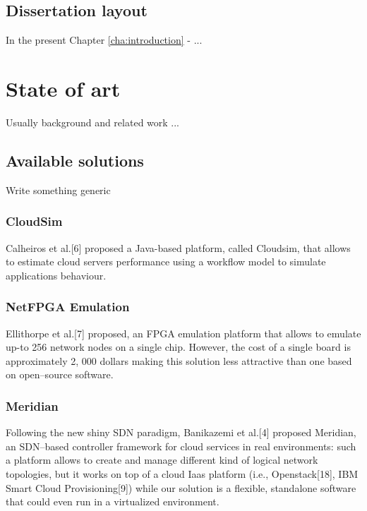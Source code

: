 \documentclass[12pt,english]{book}
\begin{document}
\section{Dissertation layout}

In the present Chapter \ref{cha:introduction} - ...


\chapter{State of art \label{cha:stateofart} }

Usually background and related work ...

\section{Available solutions}

Write something generic

\subsection{CloudSim}

Calheiros et al.[6] proposed a Java-based platform, called Cloudsim, that allows to estimate cloud servers performance using a workflow model to simulate applications behaviour. 

\subsection{NetFPGA Emulation}

Ellithorpe et al.[7] proposed, an FPGA emulation platform that allows to emulate up-to 256 network nodes on a single chip. However, the cost of a single board is approximately 2, 000 dollars making this solution less attractive than one based on open--source software.

\subsection{Meridian}

Following the new shiny SDN paradigm, Banikazemi et al.[4] proposed Meridian, an SDN--based controller
framework for cloud services in real environments: such a platform allows to create and manage different kind
of logical network topologies, but it works on top of a cloud Iaas platform (i.e., Openstack[18], IBM Smart
Cloud Provisioning[9]) while our solution is a flexible, standalone software that could even run in a virtualized environment.
\end{document}
